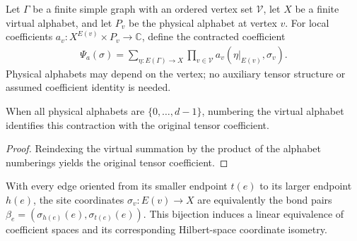 \begin{definition}%
    \label{def:peps_graph_bond_contraction}
    \leanok
    Let $\Gamma$ be a finite simple graph with an ordered vertex set $\mathcal V$,
    let $X$ be a finite virtual alphabet, and let $P_v$ be the physical alphabet
    at vertex $v$. For local coefficients $a_v:X^{E(v)}\times P_v\to\mathbb C$,
    define the contracted coefficient
    \begin{align}
        \Psi_a(\sigma)=\sum_{\eta:E(\Gamma)\to X}
        \prod_{v\in\mathcal V}a_v(\eta|_{E(v)},\sigma_v).
    \end{align}
    Physical alphabets may depend on the vertex; no auxiliary tensor structure
    or assumed coefficient identity is needed.
\end{definition}

\begin{lemma}%
    \label{thm:peps_graph_bond_contraction_tensor}
    \leanok
    When all physical alphabets are $\{0,\ldots,d-1\}$, numbering the virtual
    alphabet identifies this contraction with the original tensor coefficient.
\end{lemma}
\begin{proof}\leanok
    Reindexing the virtual summation by the product of the alphabet numberings
    yields the original tensor coefficient.
\end{proof}

\begin{definition}%
    \label{def:peps_graph_physical_bond_coordinates}
    \leanok
    With every edge oriented from its smaller endpoint $t(e)$ to its larger endpoint
    $h(e)$, the site coordinates $\sigma_v:E(v)\to X$ are equivalently the bond
    pairs $\beta_e=(\sigma_{h(e)}(e),\sigma_{t(e)}(e))$.
    This bijection induces a linear equivalence of coefficient spaces and its
    corresponding Hilbert-space coordinate isometry.
\end{definition}

